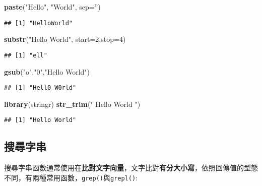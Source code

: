 \documentclass[]{book}
\newenvironment{Shaded}{\begin{snugshade}}{\end{snugshade}}
\newcommand{\KeywordTok}[1]{\textcolor[rgb]{0.13,0.29,0.53}{\textbf{{#1}}}}
\newcommand{\DataTypeTok}[1]{\textcolor[rgb]{0.13,0.29,0.53}{{#1}}}
\newcommand{\DecValTok}[1]{\textcolor[rgb]{0.00,0.00,0.81}{{#1}}}
\newcommand{\StringTok}[1]{\textcolor[rgb]{0.31,0.60,0.02}{{#1}}}
\newcommand{\NormalTok}[1]{{#1}}
\begin{document}
\begin{Shaded}
\begin{Highlighting}[]
\KeywordTok{paste}\NormalTok{(}\StringTok{"Hello"}\NormalTok{, }\StringTok{"World"}\NormalTok{, }\DataTypeTok{sep=}\StringTok{''}\NormalTok{)}
\end{Highlighting}
\end{Shaded}

\begin{verbatim}
## [1] "HelloWorld"
\end{verbatim}

\begin{Shaded}
\begin{Highlighting}[]
\KeywordTok{substr}\NormalTok{(}\StringTok{"Hello World"}\NormalTok{, }\DataTypeTok{start=}\DecValTok{2}\NormalTok{,}\DataTypeTok{stop=}\DecValTok{4}\NormalTok{)}
\end{Highlighting}
\end{Shaded}

\begin{verbatim}
## [1] "ell"
\end{verbatim}

\begin{Shaded}
\begin{Highlighting}[]
\KeywordTok{gsub}\NormalTok{(}\StringTok{"o"}\NormalTok{,}\StringTok{"0"}\NormalTok{,}\StringTok{"Hello World"}\NormalTok{)}
\end{Highlighting}
\end{Shaded}

\begin{verbatim}
## [1] "Hell0 W0rld"
\end{verbatim}

\begin{Shaded}
\begin{Highlighting}[]
\KeywordTok{library}\NormalTok{(stringr)}
\KeywordTok{str_trim}\NormalTok{(}\StringTok{" Hello World "}\NormalTok{)}
\end{Highlighting}
\end{Shaded}

\begin{verbatim}
## [1] "Hello World"
\end{verbatim}

\subsection{搜尋字串}

搜尋字串函數通常使用在\textbf{比對文字向量}，文字比對\textbf{有分大小寫}，依照回傳值的型態不同，有兩種常用函數，\texttt{grep()}與\texttt{grepl()}:
\end{document}
